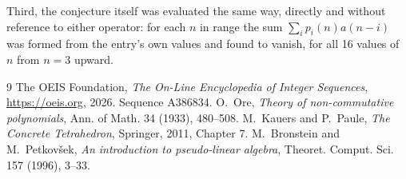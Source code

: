 \documentclass[11pt,a4paper]{article}
\theoremstyle{plain}
\theoremstyle{definition}
\begin{document}
Third, the conjecture itself was evaluated the same way, directly and without reference to
either operator: for each $n$ in range the sum $\sum_{i}p_{i}(n)a(n-i)$ was formed from the
entry's own values and found to vanish, for all 16 values of $n$ from
$n=3$ upward.

\begin{thebibliography}{9}
 The OEIS Foundation, \emph{The On-Line Encyclopedia of Integer Sequences},
\url{https://oeis.org}, 2026. Sequence A386834.
 O.~Ore, \emph{Theory of non-commutative polynomials}, Ann. of Math. 34
(1933), 480--508.
 M.~Kauers and P.~Paule, \emph{The Concrete Tetrahedron}, Springer, 2011,
Chapter 7.
 M.~Bronstein and M.~Petkov\v{s}ek, \emph{An introduction to
pseudo-linear algebra}, Theoret. Comput. Sci. 157 (1996), 3--33.
\end{thebibliography}
\end{document}
